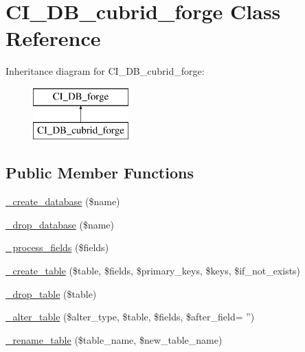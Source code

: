 \hypertarget{class_c_i___d_b__cubrid__forge}{\section{C\-I\-\_\-\-D\-B\-\_\-cubrid\-\_\-forge Class Reference}
\label{class_c_i___d_b__cubrid__forge}
}
Inheritance diagram for C\-I\-\_\-\-D\-B\-\_\-cubrid\-\_\-forge\-:\begin{figure}[H]
\begin{center}
\leavevmode
\includegraphics[height=2.000000cm]{class_c_i___d_b__cubrid__forge}
\end{center}
\end{figure}
\subsection*{Public Member Functions}
\begin{DoxyCompactItemize}
\item 
\hyperlink{class_c_i___d_b__cubrid__forge_ac70184ae4a86e97f324daa1901b78777}{\-\_\-create\-\_\-database} (\$name)
\item 
\hyperlink{class_c_i___d_b__cubrid__forge_a6e04d0af5e8e1e1f93f42d63f0744bfd}{\-\_\-drop\-\_\-database} (\$name)
\item 
\hyperlink{class_c_i___d_b__cubrid__forge_a338a54bfecc1fbfbe863e980cc8a5d44}{\-\_\-process\-\_\-fields} (\$fields)
\item 
\hyperlink{class_c_i___d_b__cubrid__forge_a99d4c17257f468337344690dd590582b}{\-\_\-create\-\_\-table} (\$table, \$fields, \$primary\-\_\-keys, \$keys, \$if\-\_\-not\-\_\-exists)
\item 
\hyperlink{class_c_i___d_b__cubrid__forge_a147efb0d859b7cf4148ff75642515231}{\-\_\-drop\-\_\-table} (\$table)
\item 
\hyperlink{class_c_i___d_b__cubrid__forge_a5aa3b886f51adfe92fc6abf6261ff881}{\-\_\-alter\-\_\-table} (\$alter\-\_\-type, \$table, \$fields, \$after\-\_\-field= '')
\item 
\hyperlink{class_c_i___d_b__cubrid__forge_aec593ba62c6ff875cafeac16b1c54ae6}{\-\_\-rename\-\_\-table} (\$table\-\_\-name, \$new\-\_\-table\-\_\-name)
\end{DoxyCompactItemize}
